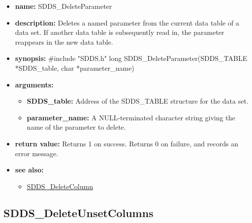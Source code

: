 \documentclass[11pt]{article}
\newcommand{\progref}[1]{\hyperref{SDDS_#1}{{\tt SDDS\_#1} (}{)}{SDDS_#1}}
\begin{document}
\begin{itemize}
\item {\bf name:}\newline
SDDS\_DeleteParameter
\item {\bf description:}\newline
Deletes a named parameter from the current data table of a data set. If another data table is subsequently read in, the parameter reappears in the new data table.
\item {\bf synopsis:} \#include "SDDS.h"\newline
long SDDS\_DeleteParameter(SDDS\_TABLE *SDDS\_table, char *parameter\_name)
\item {\bf arguments:}
\begin{itemize}
\item {\bf SDDS\_table:} Address of the SDDS\_TABLE structure for the data set.
\item {\bf parameter\_name:} A NULL-terminated character string giving the name of the parameter to delete.
\end{itemize}
\item {\bf return value:}\newline
Returns 1 on success. Returns 0 on failure, and records an error message.
\item {\bf see also:}
\begin{itemize}
\item \progref{DeleteColumn}
\end{itemize}
\end{itemize}

\subsection{SDDS\_DeleteUnsetColumns}
\label{SDDS_DeleteUnsetColumns}
\end{document}
